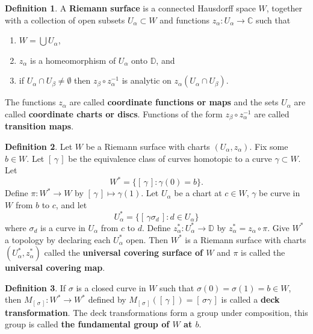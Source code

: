 \documentclass[12pt]{article}
\theoremstyle{definition}
\newtheorem{definition}{Definition}
\newcommand{\D}{\mathbb{D}}      %
\newcommand{\C}{\mathbb{C}}    %
\begin{document}
\begin{definition}
    A \textbf{Riemann surface} is a connected Hausdorff space $W$, together with a collection of open subsets $U_\alpha\subset W$ and functions $z_\alpha:U_\alpha\to \C$ such that
    \begin{enumerate}[label=(\roman*)]
        \item $W=\bigcup U_\alpha$,
        \item $z_\alpha$ is a homeomorphism of $U_\alpha$ onto $\D$, and
        \item if $U_\alpha\cap U_\beta\neq\emptyset$ then $z_\beta\circ z_\alpha^{-1}$ is analytic on $z_\alpha(U_\alpha\cap U_\beta)$.
    \end{enumerate}
    The functions $z_\alpha$ are called \textbf{coordinate functions or maps} and the sets $U_\alpha$ are called \textbf{coordinate charts or discs}. Functions of the form $z_\beta\circ z_\alpha^{-1}$ are called \textbf{transition maps}.
\end{definition}

\begin{definition}
    Let $W$ be a Riemann surface with charts $(U_\alpha,z_\alpha)$. Fix some $b\in W$. Let $[\,\gamma\,]$ be the equivalence class of curves homotopic to a curve $\gamma\subset W$. Let 
    \begin{equation*}
        W^*=\Big\{ [\,\gamma\,] : \gamma(0)=b \Big\}.
    \end{equation*}
    Define $\pi:W^*\to W$ by $[\, \gamma\, ]\mapsto \gamma(1)$. Let $U_\alpha$ be a chart at $c\in W$, $\gamma$ be curve in $W$ from $b$ to $c$, and let 
    \begin{equation*}
        U_\alpha^*=\Big\{ [\, \gamma\sigma_d\,] : d\in U_\alpha\Big\}
    \end{equation*}
    where $\sigma_d$ is a curve in $U_\alpha$ from $c$ to $d$. Define $z_\alpha^*:U_\alpha^*\to \D$ by $z_\alpha^*=z_\alpha\circ\pi$. Give $W^*$ a topology by declaring each $U_\alpha^*$ open. Then $W^*$ is a Riemann surface with charts $(U_\alpha^*,z_\alpha^*)$ called the \textbf{universal covering surface of $W$} and $\pi$ is called the \textbf{universal covering map}.
\end{definition}
\newpage
\begin{definition}
    If $\sigma$ is a closed curve in $W$ such that $\sigma(0)=\sigma(1)=b\in W$, then $M_{[\, \sigma\,]}:W^*\to W^*$ defined by $M_{[\, \sigma\,]}([\, \gamma \, ])=[\, \sigma\gamma\, ]$ is called a \textbf{deck transformation}. The deck transformations form a group under composition, this group is called \textbf{the fundamental group of $W$ at $b$}.
\end{definition}
\end{document}
